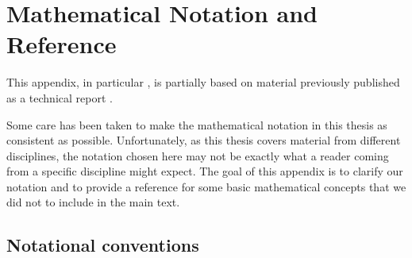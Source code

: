 \chapter{Mathematical Notation and Reference}
\label{app:mathematical_notation}

\begin{PriorPublication}
This appendix, in particular , is partially based on material previously published as a technical report \citep{stockel2021discrete}.
\end{PriorPublication}

Some care has been taken to make the mathematical notation in this thesis as consistent as possible.
Unfortunately, as this thesis covers material from different disciplines, the notation chosen here may not be exactly what a reader coming from a specific discipline might expect.
The goal of this appendix is to clarify our notation and to provide a reference for some basic mathematical concepts that we did not to include in the main text.

\section{Notational conventions}

